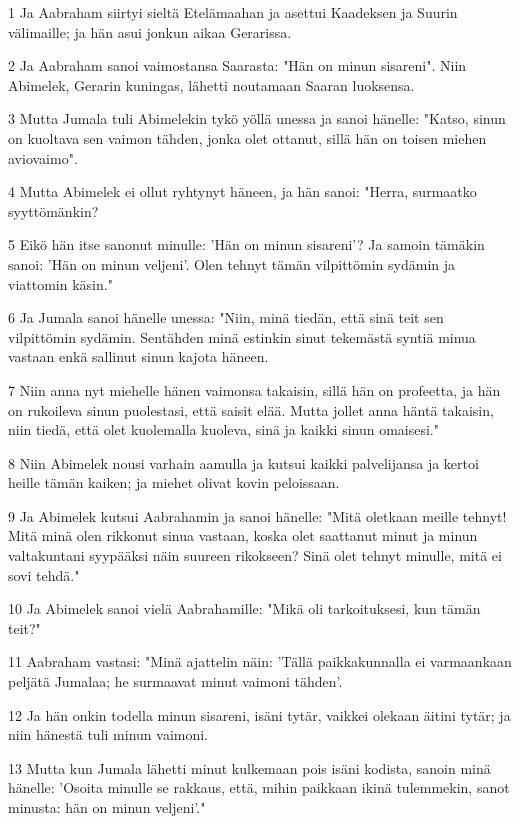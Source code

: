 \par 1 Ja Aabraham siirtyi sieltä Etelämaahan ja asettui Kaadeksen ja Suurin välimaille; ja hän asui jonkun aikaa Gerarissa.
\par 2 Ja Aabraham sanoi vaimostansa Saarasta: "Hän on minun sisareni". Niin Abimelek, Gerarin kuningas, lähetti noutamaan Saaran luoksensa.
\par 3 Mutta Jumala tuli Abimelekin tykö yöllä unessa ja sanoi hänelle: "Katso, sinun on kuoltava sen vaimon tähden, jonka olet ottanut, sillä hän on toisen miehen aviovaimo".
\par 4 Mutta Abimelek ei ollut ryhtynyt häneen, ja hän sanoi: "Herra, surmaatko syyttömänkin?
\par 5 Eikö hän itse sanonut minulle: 'Hän on minun sisareni'? Ja samoin tämäkin sanoi: 'Hän on minun veljeni'. Olen tehnyt tämän vilpittömin sydämin ja viattomin käsin."
\par 6 Ja Jumala sanoi hänelle unessa: "Niin, minä tiedän, että sinä teit sen vilpittömin sydämin. Sentähden minä estinkin sinut tekemästä syntiä minua vastaan enkä sallinut sinun kajota häneen.
\par 7 Niin anna nyt miehelle hänen vaimonsa takaisin, sillä hän on profeetta, ja hän on rukoileva sinun puolestasi, että saisit elää. Mutta jollet anna häntä takaisin, niin tiedä, että olet kuolemalla kuoleva, sinä ja kaikki sinun omaisesi."
\par 8 Niin Abimelek nousi varhain aamulla ja kutsui kaikki palvelijansa ja kertoi heille tämän kaiken; ja miehet olivat kovin peloissaan.
\par 9 Ja Abimelek kutsui Aabrahamin ja sanoi hänelle: "Mitä oletkaan meille tehnyt! Mitä minä olen rikkonut sinua vastaan, koska olet saattanut minut ja minun valtakuntani syypääksi näin suureen rikokseen? Sinä olet tehnyt minulle, mitä ei sovi tehdä."
\par 10 Ja Abimelek sanoi vielä Aabrahamille: "Mikä oli tarkoituksesi, kun tämän teit?"
\par 11 Aabraham vastasi: "Minä ajattelin näin: 'Tällä paikkakunnalla ei varmaankaan peljätä Jumalaa; he surmaavat minut vaimoni tähden'.
\par 12 Ja hän onkin todella minun sisareni, isäni tytär, vaikkei olekaan äitini tytär; ja niin hänestä tuli minun vaimoni.
\par 13 Mutta kun Jumala lähetti minut kulkemaan pois isäni kodista, sanoin minä hänelle: 'Osoita minulle se rakkaus, että, mihin paikkaan ikinä tulemmekin, sanot minusta: hän on minun veljeni'."
